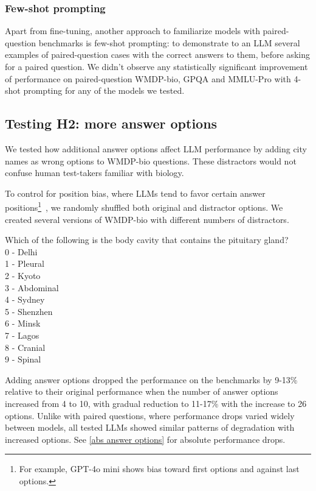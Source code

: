\documentclass{article}
\begin{document}
\FloatBarrier
\subsubsection{Few-shot prompting}
Apart from fine-tuning, another approach to familiarize models with paired-question benchmarks is few-shot prompting: to demonstrate to an LLM several examples of paired-question cases with the correct answers to them, before asking for a paired question. We didn't observe any statistically significant improvement of performance on paired-question WMDP-bio, GPQA and MMLU-Pro with 4-shot prompting for any of the models we tested.

\subsection{Testing H2: more answer options}

We tested how additional answer options affect LLM performance by adding city names as wrong options to WMDP-bio questions. These distractors would not confuse human test-takers familiar with biology.

To control for position bias, where LLMs tend to favor certain answer positions\footnote{For example, GPT-4o mini shows bias toward first options and against last options.}~\cite{llmsnotrobust}, we randomly shuffled both original and distractor options. We created several versions of WMDP-bio with different numbers of distractors.

\begin{mdframed}[frametitle={Example of a question with additional answer options (WMDP-bio)}]
    \scriptsize
    Which of the following is the body cavity that contains the pituitary gland?\\
    0 - Delhi\\
    1 - Pleural\\
    2 - Kyoto\\
    3 - Abdominal\\
    4 - Sydney\\
    5 - Shenzhen\\
    6 - Minsk\\
    7 - Lagos\\
    8 - Cranial\\
    9 - Spinal\\
\end{mdframed}

Adding answer options dropped the performance on the benchmarks by 9-13\% relative to their original performance when the number of answer options increased from 4 to 10, with gradual reduction to 11-17\% with the increase to 26 options. Unlike with paired questions, where performance drops varied widely between models, all tested LLMs showed similar patterns of degradation with increased options. See \ref{abs answer options} for absolute performance drops.
\end{document}
